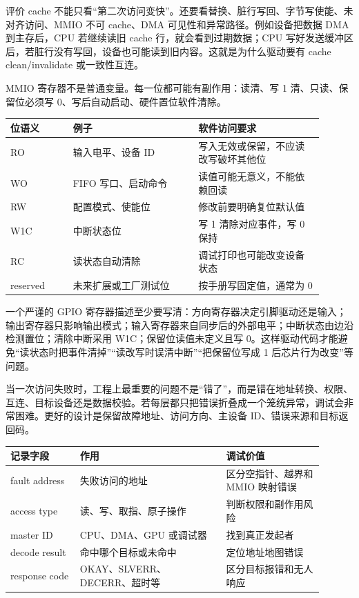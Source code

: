 评价 cache 不能只看“第二次访问变快”。还要看替换、脏行写回、字节写使能、未对齐访问、MMIO 不可 cache、DMA 可见性和异常路径。例如设备把数据 DMA 到主存后，CPU 若继续读旧 cache 行，就会看到过期数据；CPU 写好发送缓冲区后，若脏行没有写回，设备也可能读到旧内容。这就是为什么驱动要有 cache clean/invalidate 或一致性互连。

MMIO 寄存器不是普通变量。每一位都可能有副作用：读清、写 1 清、只读、保留位必须写 0、写后自动启动、硬件置位软件清除。

\begin{longtable}{L{0.18\linewidth}L{0.36\linewidth}L{0.36\linewidth}}
\toprule
位语义 & 例子 & 软件访问要求 \\
\midrule
RO & 输入电平、设备 ID & 写入无效或保留，不应读改写破坏其他位 \\\tablerowrule
WO & FIFO 写口、启动命令 & 读值可能无意义，不能依赖回读 \\\tablerowrule
RW & 配置模式、使能位 & 修改前要明确复位默认值 \\\tablerowrule
W1C & 中断状态位 & 写 1 清除对应事件，写 0 保持 \\\tablerowrule
RC & 读状态自动清除 & 调试打印也可能改变设备状态 \\\tablerowrule
reserved & 未来扩展或工厂测试位 & 按手册写固定值，通常为 0 \\
\bottomrule
\end{longtable}

一个严谨的 GPIO 寄存器描述至少要写清：方向寄存器决定引脚驱动还是输入；输出寄存器只影响输出模式；输入寄存器来自同步后的外部电平；中断状态由边沿检测置位；清除中断采用 W1C；保留位读值未定义且写 0。这样驱动代码才能避免“读状态时把事件清掉”“读改写时误清中断”“把保留位写成 1 后芯片行为改变”等问题。

当一次访问失败时，工程上最重要的问题不是“错了”，而是错在地址转换、权限、互连、目标设备还是数据校验。若每层都只把错误折叠成一个笼统异常，调试会非常困难。更好的设计是保留故障地址、访问方向、主设备 ID、错误来源和目标返回码。

\begin{longtable}{L{0.2\linewidth}L{0.42\linewidth}L{0.28\linewidth}}
\toprule
记录字段 & 作用 & 调试价值 \\
\midrule
fault address & 失败访问的地址 & 区分空指针、越界和 MMIO 映射错误 \\\tablerowrule
access type & 读、写、取指、原子操作 & 判断权限和副作用风险 \\\tablerowrule
master ID & CPU、DMA、GPU 或调试器 & 找到真正发起者 \\\tablerowrule
decode result & 命中哪个目标或未命中 & 定位地址地图错误 \\\tablerowrule
response code & OKAY、SLVERR、DECERR、超时等 & 区分目标报错和无人响应 \\
\bottomrule
\end{longtable}

